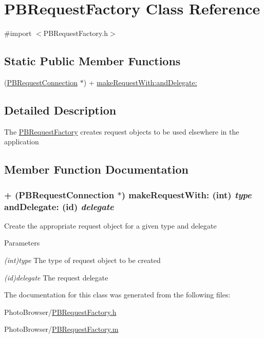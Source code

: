 \hypertarget{interface_p_b_request_factory}{
\section{PBRequestFactory Class Reference}
\label{interface_p_b_request_factory}
}


{\ttfamily \#import $<$PBRequestFactory.h$>$}

\subsection*{Static Public Member Functions}
\begin{DoxyCompactItemize}
\item 
(\hyperlink{interface_p_b_request_connection}{PBRequestConnection} $\ast$) + \hyperlink{interface_p_b_request_factory_a88a3e4108d6c673ba8c62972366ce7e6}{makeRequestWith:andDelegate:}
\end{DoxyCompactItemize}


\subsection{Detailed Description}
The \hyperlink{interface_p_b_request_factory}{PBRequestFactory} creates request objects to be used elsewhere in the application 

\subsection{Member Function Documentation}
\hypertarget{interface_p_b_request_factory_a88a3e4108d6c673ba8c62972366ce7e6}{
\subsubsection[{makeRequestWith:andDelegate:}]{\setlength{\rightskip}{0pt plus 5cm}+ ({\bf PBRequestConnection} $\ast$) makeRequestWith: (int) {\em type}\/ andDelegate: (id) {\em delegate}}}
\label{interface_p_b_request_factory_a88a3e4108d6c673ba8c62972366ce7e6}
Create the appropriate request object for a given type and delegate 
\begin{DoxyParams}{Parameters}
\item[{\em (int)type}]The type of request object to be created \item[{\em (id)delegate}]The request delegate \end{DoxyParams}


The documentation for this class was generated from the following files:\begin{DoxyCompactItemize}
\item 
PhotoBrowser/\hyperlink{_p_b_request_factory_8h}{PBRequestFactory.h}\item 
PhotoBrowser/\hyperlink{_p_b_request_factory_8m}{PBRequestFactory.m}\end{DoxyCompactItemize}
